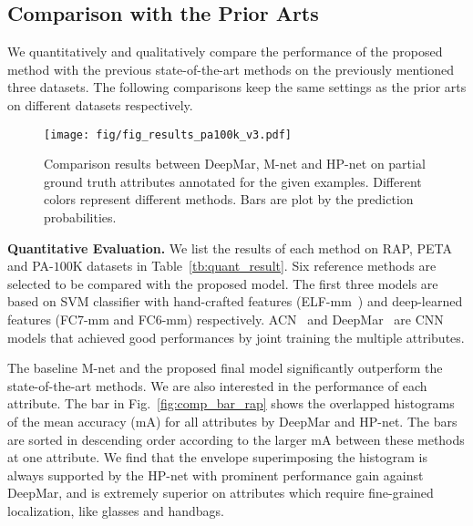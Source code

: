 \documentclass[10pt,twocolumn,letterpaper]{article}
\begin{document}
\subsection{Comparison with the Prior Arts}
\label{subsec:attribute_comp_results}

We quantitatively and qualitatively compare the performance of the proposed method with the previous state-of-the-art methods on the previously mentioned three datasets.
%
The following comparisons keep the same settings as the prior arts on different datasets respectively.





\begin{figure}[t]
\centering
\texttt{[image: fig/fig\_results\_pa100k\_v3.pdf]}
\caption{
Comparison results between DeepMar, M-net and HP-net on partial ground truth attributes annotated for the given examples. Different colors represent different methods. Bars are plot by the prediction probabilities.
}
\label{fig:result_pa100k}
\vspace{-0.2cm}
\end{figure}


\noindent\textbf{Quantitative Evaluation.}
%
We list the results of each method on RAP, PETA and PA-$100$K datasets in Table~\ref{tb:quant_result}.
%
Six reference methods are selected to be compared with the proposed model.
%
The first three models are based on SVM classifier with hand-crafted features (ELF-mm~\cite{gray2008viewpoint,prosser2010person}) and deep-learned features (FC7-mm and FC6-mm) respectively.
%
ACN~\cite{sudowe2015person} and DeepMar~\cite{li2015multi} are CNN models that achieved good performances by joint training the multiple attributes.

The baseline M-net and the proposed final model significantly outperform the state-of-the-art methods.
%
We are also interested in the performance of each attribute.
%
The bar in Fig.~\ref{fig:comp_bar_rap} shows the overlapped histograms of the mean accuracy (mA) for all attributes by DeepMar and HP-net.
%
The bars are sorted in descending order according to the larger mA between these methods at one attribute.
%
We find that the envelope superimposing the histogram is always supported by the HP-net with prominent performance gain against DeepMar, and is extremely superior on attributes which require fine-grained localization, like glasses and handbags.
\end{document}
